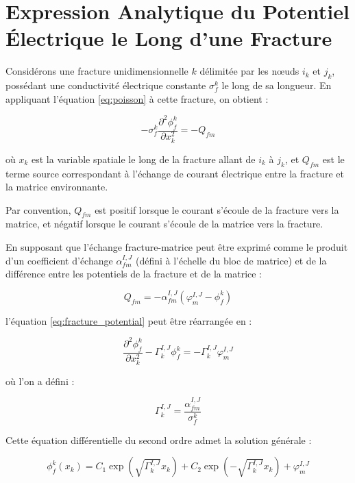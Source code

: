 \section{Expression Analytique du Potentiel Électrique le Long d'une Fracture}
\label{sec:analytical}

Considérons une fracture unidimensionnelle $k$ délimitée par les nœuds $i_k$ et $j_k$, possédant une conductivité électrique constante $\sigma_f^k$ le long de sa longueur. En appliquant l'équation \eqref{eq:poisson} à cette fracture, on obtient :

\begin{equation}
-\sigma_f^k \frac{\partial^2 \phi_f^k}{\partial x_k^2} = -Q_{fm}
\label{eq:fracture_potential}
\end{equation}

où $x_k$ est la variable spatiale le long de la fracture allant de $i_k$ à $j_k$, et $Q_{fm}$ est le terme source correspondant à l'échange de courant électrique entre la fracture et la matrice environnante.

Par convention, $Q_{fm}$ est positif lorsque le courant s'écoule de la fracture vers la matrice, et négatif lorsque le courant s'écoule de la matrice vers la fracture.

En supposant que l'échange fracture-matrice peut être exprimé comme le produit d'un coefficient d'échange $\alpha_{fm}^{I,J}$ (défini à l'échelle du bloc de matrice) et de la différence entre les potentiels de la fracture et de la matrice :

\begin{equation}
Q_{fm} = -\alpha_{fm}^{I,J}(\varphi_m^{I,J} - \phi_f^k)
\label{eq:exchange_rate}
\end{equation}

l'équation \eqref{eq:fracture_potential} peut être réarrangée en :

\begin{equation}
\frac{\partial^2 \phi_f^k}{\partial x_k^2} - \Gamma_k^{I,J} \phi_f^k = -\Gamma_k^{I,J} \varphi_m^{I,J}
\label{eq:fracture_diff}
\end{equation}

où l'on a défini :

\begin{equation}
\Gamma_k^{I,J} = \frac{\alpha_{fm}^{I,J}}{\sigma_f^k}
\end{equation}

Cette équation différentielle du second ordre admet la solution générale :

\begin{equation}
\phi_f^k(x_k) = C_1 \exp\left(\sqrt{\Gamma_k^{I,J}} x_k\right) + C_2 \exp\left(-\sqrt{\Gamma_k^{I,J}} x_k\right) + \varphi_m^{I,J}
\label{eq:general_solution}
\end{equation}

